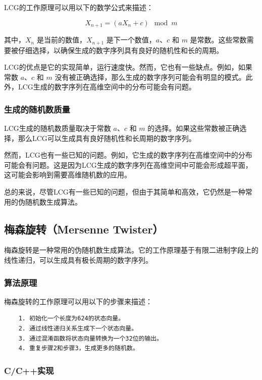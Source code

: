 \documentclass{ctexart}
\begin{document}
LCG的工作原理可以用以下的数学公式来描述：

\[ X_{n+1} = (aX_n + c) \mod{m} \]

其中，\(X_n\) 是当前的数值，\(X_{n+1}\) 是下一个数值，\(a\)、\(c\) 和 \(m\) 是常数。这些常数需要被仔细选择，以确保生成的数字序列具有良好的随机性和长的周期。

LCG的优点是它的实现简单，运行速度快。然而，它也有一些缺点。例如，如果常数 \(a\)、\(c\) 和 \(m\) 没有被正确选择，那么生成的数字序列可能会有明显的模式。此外，LCG生成的数字序列在高维空间中的分布可能会有问题。

\subsubsection{生成的随机数质量}

LCG生成的随机数质量取决于常数 \(a\)、\(c\) 和 \(m\) 的选择。如果这些常数被正确选择，那么LCG可以生成具有良好随机性和长周期的数字序列。

然而，LCG也有一些已知的问题。例如，它生成的数字序列在高维空间中的分布可能会有问题。这是因为LCG生成的数字序列在高维空间中可能会形成超平面，这可能会影响到需要高维随机数的应用。

总的来说，尽管LCG有一些已知的问题，但由于其简单和高效，它仍然是一种常用的伪随机数生成算法。
    \subsection{梅森旋转（Mersenne Twister）}

    梅森旋转是一种常用的伪随机数生成算法。它的工作原理基于有限二进制字段上的线性递归，可以生成具有极长周期的数字序列。

    \subsubsection{算法原理}

    梅森旋转的工作原理可以用以下的步骤来描述：

    \begin{lstlisting}
    1. 初始化一个长度为624的状态向量。
    2. 通过线性递归关系生成下一个状态向量。
    3. 通过混淆函数将状态向量转换为一个32位的输出。
    4. 重复步骤2和步骤3，生成更多的随机数。
    \end{lstlisting}

    \subsubsection{C/C++实现}
\end{document}
